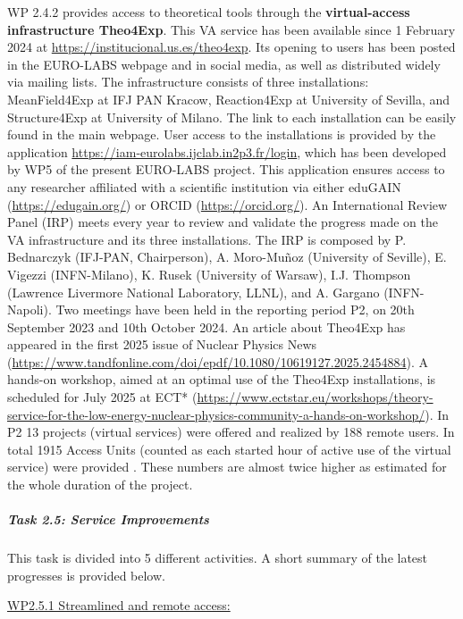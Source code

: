 WP 2.4.2 provides access to theoretical tools through the \textbf{virtual-access infrastructure Theo4Exp}. This VA service has been available since 1 February 2024 at \url{https://institucional.us.es/theo4exp}. Its opening to users has been posted in the EURO-LABS webpage and in social media, as well as distributed widely via mailing lists. The infrastructure consists of three installations: MeanField4Exp at IFJ PAN Kracow, Reaction4Exp at University of Sevilla, and Structure4Exp at University of Milano. The link to each installation can be easily found in the main webpage. User access to the installations is provided by the application \url{https://iam-eurolabs.ijclab.in2p3.fr/login}, which has been developed by WP5 of the present EURO-LABS project. This application ensures access to any researcher affiliated with a scientific institution via either eduGAIN (\url{https://edugain.org/}) or ORCID (\url{https://orcid.org/}).
An International Review Panel (IRP) meets every year to review and validate the progress made on the VA infrastructure and its three installations. The IRP is composed by P. Bednarczyk (IFJ-PAN, Chairperson), A. Moro-Mu\~noz (University of Seville), E. Vigezzi (INFN-Milano), K. Rusek (University of Warsaw), I.J. Thompson (Lawrence Livermore National Laboratory, LLNL), and A. Gargano (INFN-Napoli). Two meetings have been held in the reporting period P2, on 20th September 2023 and 10th October 2024. An article about Theo4Exp has appeared in the first 2025 issue of Nuclear Physics News 
(\url{https://www.tandfonline.com/doi/epdf/10.1080/10619127.2025.2454884}). 
A hands-on workshop, aimed at an optimal use of the Theo4Exp installations, is scheduled for July 2025 at ECT* (\url{https://www.ectstar.eu/workshops/theory-service-for-the-low-energy-nuclear-physics-community-a-hands-on-workshop/}).
In P2 13 projects (virtual services) were offered and realized by 188 remote users. In total 1915 Access Units (counted as each started hour of active use of the virtual service) were provided . These numbers are almost twice higher as estimated for the whole duration of the project.


\subparagraph{Task 2.5: Service Improvements } \mbox{}


This task is divided into 5 different activities. A short summary of the latest progresses is provided below.

\underline{WP2.5.1 Streamlined and remote access:} 

